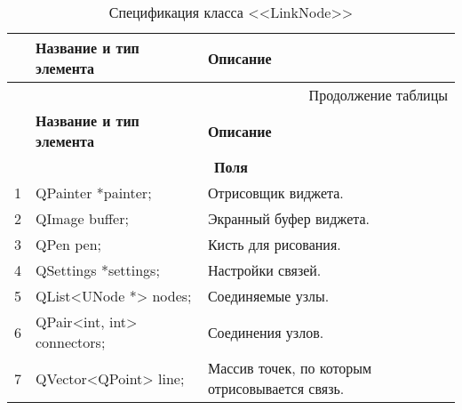 \small
\singlespacing
\begin{longtable}[h]{|p{}|p{}|p{}|}
  \caption{Спецификация класса <<LinkNode>>}
	\\ \hline
	  \textbf{\No}                  &
	  \textbf{Название и тип элемента}  &
	  \textbf{Описание}
	\\ \hline
  \endfirsthead

  \multicolumn{3}{r}{Продолжение таблицы \thetable{}}
  \\ \hline
	  \textbf{\No}                  &
	  \textbf{Название и тип элемента}  &
	  \textbf{Описание}
	\\ \hline
  \endhead

  \multicolumn{3}{|c|}{\textbf{Поля}} \\
  \hline
  1 & QPainter       *painter; & Отрисовщик виджета.\\ \hline
  2 & QImage          buffer; & Экранный буфер виджета. \\ \hline
  3 & QPen            pen; &  Кисть для рисования.\\ \hline
  4 & QSettings      *settings; & Настройки связей.\\ \hline
  5 & QList<UNode *>  nodes; & Соединяемые узлы.\\ \hline
  6 & QPair<int, int> connectors; & Соединения узлов.\\ \hline
  7 & QVector<QPoint> line; & Массив точек, по которым отрисовывается связь.\\ \hline


\end{longtable}
